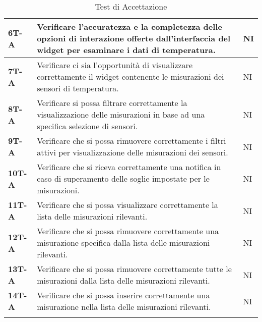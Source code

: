 \begin{longtable}{|>{\raggedright\arraybackslash}m{}|>{\raggedright\arraybackslash}m{}|>{\raggedright\arraybackslash}m{}|}
	\hline
	\textbf{6T-A}   & Verificare l’accuratezza e la completezza delle opzioni di interazione offerte dall’interfaccia del widget per esaminare i dati di temperatura.                       & NI             \\
	\hline
	\textbf{7T-A}   & Verificare ci sia l’opportunità di visualizzare correttamente il widget contenente le misurazioni dei sensori di temperatura.                                         & NI             \\
	\hline
	\textbf{8T-A}   & Verificare si possa filtrare correttamente la visualizzazione delle misurazioni in base ad una specifica selezione di sensori.                                        & NI             \\
	\hline
	\textbf{9T-A}   & Verificare che si possa rimuovere correttamente i filtri attivi per visualizzazione delle misurazioni dei sensori.                                                    & NI             \\
	\hline
	\textbf{10T-A}  & Verificare che si riceva correttamente una notifica in caso di superamento delle soglie impostate per le misurazioni.                                                 & NI             \\
	\hline
	\textbf{11T-A}  & Verificare che si possa visualizzare correttamente la lista delle misurazioni rilevanti.                                                                              & NI             \\
	\hline
	\textbf{12T-A}  & Verificare che si possa rimuovere correttamente una misurazione specifica dalla lista delle misurazioni rilevanti.                                                    & NI             \\
	\hline
	\textbf{13T-A}  & Verificare che si possa rimuovere correttamente tutte le misurazioni dalla lista delle misurazioni rilevanti.                                                         & NI             \\
	\hline
	\textbf{14T-A}  & Verificare che si possa inserire correttamente una misurazione nella lista delle misurazioni rilevanti.                                                               & NI             \\
	\hline
	\caption{Test di Accettazione}
\end{longtable}
